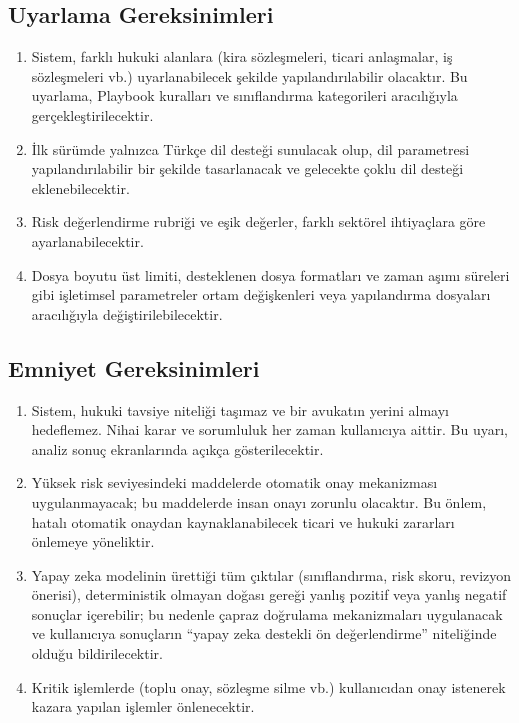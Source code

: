 \documentclass[12pt, a4paper]{article}
\begin{document}
\subsection{Uyarlama Gereksinimleri}

\begin{enumerate}[leftmargin=2cm]
    \item Sistem, farklı hukuki alanlara (kira sözleşmeleri, ticari anlaşmalar, iş sözleşmeleri vb.) uyarlanabilecek şekilde yapılandırılabilir olacaktır. Bu uyarlama, Playbook kuralları ve sınıflandırma kategorileri aracılığıyla gerçekleştirilecektir.
    \item İlk sürümde yalnızca Türkçe dil desteği sunulacak olup, dil parametresi yapılandırılabilir bir şekilde tasarlanacak ve gelecekte çoklu dil desteği eklenebilecektir.
    \item Risk değerlendirme rubriği ve eşik değerler, farklı sektörel ihtiyaçlara göre ayarlanabilecektir.
    \item Dosya boyutu üst limiti, desteklenen dosya formatları ve zaman aşımı süreleri gibi işletimsel parametreler ortam değişkenleri veya yapılandırma dosyaları aracılığıyla değiştirilebilecektir.
\end{enumerate}

\subsection{Emniyet Gereksinimleri}

\begin{enumerate}[leftmargin=2cm]
    \item Sistem, hukuki tavsiye niteliği taşımaz ve bir avukatın yerini almayı hedeflemez. Nihai karar ve sorumluluk her zaman kullanıcıya aittir. Bu uyarı, analiz sonuç ekranlarında açıkça gösterilecektir.
    \item Yüksek risk seviyesindeki maddelerde otomatik onay mekanizması uygulanmayacak; bu maddelerde insan onayı zorunlu olacaktır. Bu önlem, hatalı otomatik onaydan kaynaklanabilecek ticari ve hukuki zararları önlemeye yöneliktir.
    \item Yapay zeka modelinin ürettiği tüm çıktılar (sınıflandırma, risk skoru, revizyon önerisi), deterministik olmayan doğası gereği yanlış pozitif veya yanlış negatif sonuçlar içerebilir; bu nedenle çapraz doğrulama mekanizmaları uygulanacak ve kullanıcıya sonuçların ``yapay zeka destekli ön değerlendirme'' niteliğinde olduğu bildirilecektir.
    \item Kritik işlemlerde (toplu onay, sözleşme silme vb.) kullanıcıdan onay istenerek kazara yapılan işlemler önlenecektir.
\end{enumerate}
\end{document}
